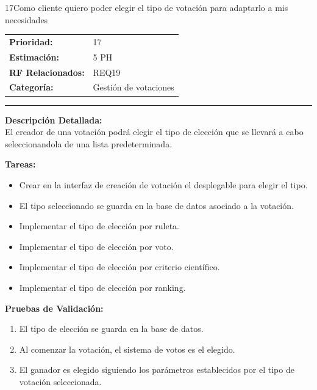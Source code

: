 \begin{hu_card}{17}{Como cliente quiero poder elegir el tipo de votación para adaptarlo a mis necesidades}
    \begin{tabularx}{\linewidth}{l X}
        \textbf{Prioridad:}   & 17\\
        \textbf{Estimación:}  & 5 PH \\
        \textbf{RF Relacionados:} & REQ19 \\
        \textbf{Categoría:} & Gestión de votaciones \\
    \end{tabularx}

    \vspace{2mm}
    \hrule
    \vspace{2mm}

    \textbf{Descripción Detallada:} \\
    El creador de una votación podrá elegir el tipo de elección que se llevará a cabo seleccionandola de una lista predeterminada.

    \vspace{2mm}
    \textbf{Tareas:}
    \begin{itemize}[noitemsep, topsep=0pt]
        \item Crear en la interfaz de creación de votación el desplegable para elegir el tipo.
        \item El tipo seleccionado se guarda en la base de datos asociado a la votación.
        \item Implementar el tipo de elección por ruleta.
        \item Implementar el tipo de elección por voto.
        \item Implementar el tipo de elección por criterio científico.
        \item Implementar el tipo de elección por ranking.
    \end{itemize}

    \vspace{2mm}
    \textbf{Pruebas de Validación:}
    \begin{enumerate}[noitemsep, topsep=0pt]
        \item El tipo de elección se guarda en la base de datos.
        \item Al comenzar la votación, el sistema de votos es el elegido.
        \item El ganador es elegido siguiendo los parámetros establecidos por el tipo de votación seleccionada.
    \end{enumerate}
\end{hu_card}


